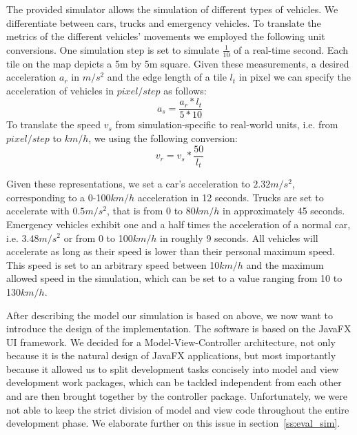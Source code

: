 The provided simulator allows the simulation of different types of vehicles. We differentiate between cars, trucks and emergency vehicles. To translate the metrics of the different vehicles' movements we employed the following unit conversions. One simulation step is set to simulate $\frac{1}{10}$ of a real-time second. Each tile on the map depicts a 5m by 5m square. Given these measurements, a desired acceleration $a_r$ in $m/s^2$ and the edge length of a tile $l_t$ in pixel we can specify the acceleration of vehicles in $pixel/step$ as follows:
	\begin{equation}\label{for:acceleration}	
		a_s = \frac{a_r * l_t}{5 * 10}
	\end{equation}
	To translate the speed $v_s$ from simulation-specific to real-world units, i.e. from $pixel/step$ to $km/h$, we using the following conversion:
	\begin{equation}\label{for:speed}
		v_r = v_s * \frac{50}{l_t} 
	\end{equation}
	
Given these representations, we set a car's acceleration to $2.32m/s^2$, corresponding to a 0-100$km/h$ acceleration in 12 seconds. Trucks are set to accelerate with $0.5m/s^2$, that is from 0 to 80$km/h$ in approximately 45 seconds. Emergency vehicles exhibit 	one and a half times the acceleration of a normal car, i.e. $3.48m/s^2$ or from 0 to 100$km/h$ in roughly 9 seconds. All vehicles will accelerate as long as their speed is lower than their personal maximum speed. This speed is set to an arbitrary speed between 10$km/h$ and the maximum allowed speed in the simulation, which can be set to a value ranging from 10 to 130$km/h$.
	
After describing the model our simulation is based on above, we now want to introduce the design of the implementation. The software is based on the JavaFX UI framework. We decided for a Model-View-Controller architecture, not only because it is the natural design of JavaFX applications, but most importantly because it allowed us to split development tasks concisely into model and view development work packages, which can be tackled independent from each other and are then brought together by the controller package. Unfortunately, we were not able to keep the strict division of model and view code throughout the entire development phase. We elaborate further on this issue in section~\ref{ss:eval_sim}. 

